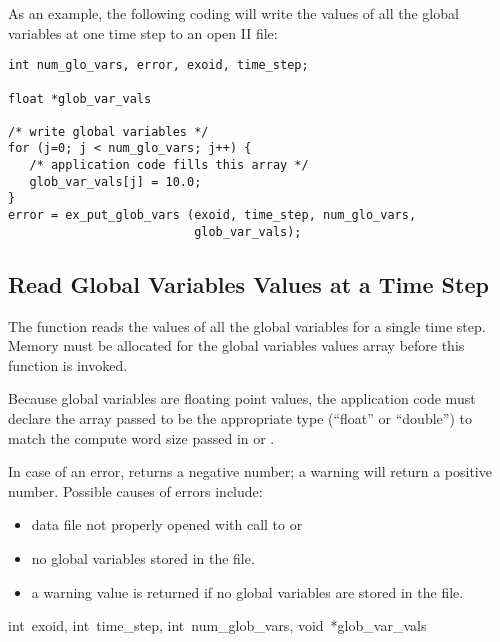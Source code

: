 As an example, the following coding will write the values of all the
global variables at one time step to an open \exo{} II file:

\begin{lstlisting}
int num_glo_vars, error, exoid, time_step;

float *glob_var_vals

/* write global variables */
for (j=0; j < num_glo_vars; j++) {
   /* application code fills this array */
   glob_var_vals[j] = 10.0;
}
error = ex_put_glob_vars (exoid, time_step, num_glo_vars,
                          glob_var_vals);
\end{lstlisting}

\subsection{Read Global Variables Values at a Time Step}

The function  reads the values of all the
global variables for a single time step. Memory must be allocated for
the global variables values array before this function is invoked.

Because global variables are floating point values, the application
code must declare the array passed to be the appropriate type
(``float'' or ``double'') to match the compute word size passed in
 or .

In case of an error,  returns a negative
number; a warning will return a positive number. Possible causes of
errors include:

\begin{itemize}
 \item data file not properly opened with call to 
 or 

 \item no global variables stored in the file.

 \item a warning value is returned if no global variables are stored
 in the file.
\end{itemize}


{int~exoid,
int~time_step,
int~num_glob_vars,
void~*glob_var_vals}


